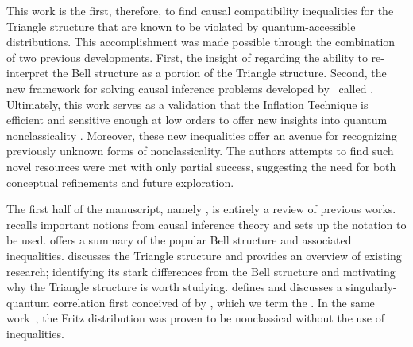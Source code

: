 \documentclass[aps, 10pt, english, twoside, pra, nofootinbib, tightenlines, longbibliography, superscriptaddress]{revtex4-1}
\begin{document}
    This work is the first, therefore, to find causal compatibility inequalities for the Triangle structure that are known to be violated by quantum-accessible distributions. This accomplishment was made possible through the combination of two previous developments. First, the insight of \citet{Fritz_2012} regarding the ability to re-interpret the Bell structure as a portion of the Triangle structure. Second, the new framework for solving causal inference problems developed by~\citet{Inflation} called . Ultimately, this work serves as a validation that the Inflation Technique is efficient and sensitive enough at low orders to offer new insights into quantum nonclassicality \cite{Navascues_2017}. Moreover, these new inequalities offer an avenue for recognizing previously unknown forms of nonclassicality. The authors attempts to find such novel resources were met with only partial success, suggesting the need for both conceptual refinements and future exploration.

    The first half of the manuscript, namely , is entirely a review of previous works.  recalls important notions from causal inference theory and sets up the notation to be used.  offers a summary of the popular Bell structure and associated inequalities.  discusses the Triangle structure and provides an overview of existing research; identifying its stark differences from the Bell structure and motivating why the Triangle structure is worth studying.  defines and discusses a singularly-quantum correlation first conceived of by \citet{Fritz_2012}, which we term the . In the same work~\cite{Fritz_2012}, the Fritz distribution was proven to be nonclassical without the use of inequalities.
\end{document}
